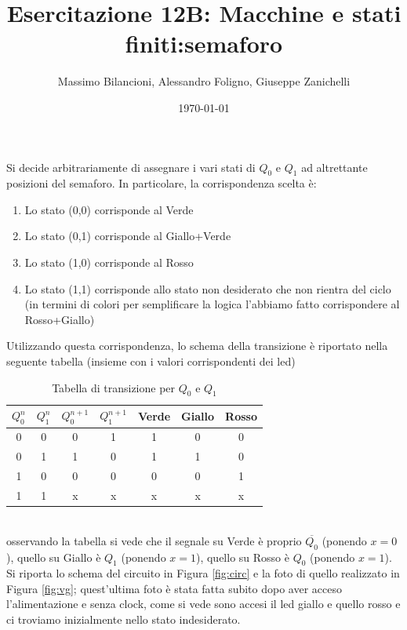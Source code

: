 \documentclass[10pt,a4paper]{article}
\date{\today}
\title{Esercitazione 12B: Macchine e stati finiti:semaforo}
\author{Massimo Bilancioni, Alessandro Foligno, Giuseppe Zanichelli}
\begin{document}
	
\maketitle
Si decide arbitrariamente di assegnare i vari stati di $Q_0$ e $Q_1$ ad altrettante posizioni del semaforo. In particolare, la corrispondenza scelta è:\\
\begin{enumerate}
	\item Lo stato (0,0) corrisponde al Verde
	\item Lo stato (0,1) corrisponde al Giallo+Verde
	\item Lo stato (1,0) corrisponde al Rosso
	\item Lo stato (1,1) corrisponde allo stato non desiderato che non rientra del ciclo (in termini di colori per semplificare la  logica  l'abbiamo fatto corrispondere al Rosso+Giallo)
\end{enumerate}
Utilizzando questa corrispondenza, lo schema della transizione è riportato nella seguente tabella (insieme con i valori corrispondenti dei led)\
\begin{table}[h]\centering
\begin{tabular}{|c|c|c|c|c|c|c|}
	\hline 
	$Q_0^n$ & $Q_1^n$ & $Q_0^{n+1}$ & $Q_1^{n+1}$ & Verde & Giallo & Rosso \\ 
	\hline 
	0 & 0 & 0 & 1 & 1 & 0 & 0 \\ 
	\hline 
	0 & 1 & 1 & 0 & 1 & 1 & 0 \\ 
	\hline 
	1 & 0 & 0 & 0 & 0 & 0 & 1 \\ 
	\hline 
	1 & 1 & x & x & x & x & x \\ 
	\hline 
\end{tabular} 	
\caption{Tabella di transizione per $Q_0$ e $Q_1$}
\end{table}
\\
osservando la tabella si vede che il segnale su Verde è proprio $\overline{Q_0}$ (ponendo $x =0$), quello su Giallo è $Q_1$ (ponendo $x= 1$), quello su Rosso è $Q_0$ (ponendo $x= 1$).
Si riporta lo schema del circuito in Figura \ref{fig:circ} e la foto di quello realizzato in Figura \ref{fig:vg}; quest'ultima foto è stata fatta subito dopo aver acceso l'alimentazione e senza clock, come si vede sono accesi il led giallo e quello rosso e ci troviamo inizialmente nello stato indesiderato. 
\end{document}
